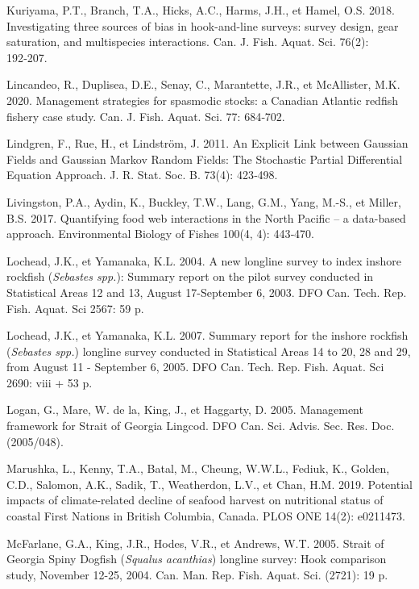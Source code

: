\documentclass[french,11pt]{book}
\begin{document}
\leavevmode\hypertarget{ref-kuriyama2018}{}%
Kuriyama, P.T., Branch, T.A., Hicks, A.C., Harms, J.H., et Hamel, O.S. 2018. Investigating three sources of bias in hook-and-line surveys: survey design, gear saturation, and multispecies interactions. Can. J. Fish. Aquat. Sci. 76(2): 192‑207.

\leavevmode\hypertarget{ref-lincandeo2020}{}%
Lincandeo, R., Duplisea, D.E., Senay, C., Marantette, J.R., et McAllister, M.K. 2020. Management strategies for spasmodic stocks: a Canadian Atlantic redfish fishery case study. Can. J. Fish. Aquat. Sci. 77: 684‑702.

\leavevmode\hypertarget{ref-lindgren2011}{}%
Lindgren, F., Rue, H., et Lindström, J. 2011. An Explicit Link between Gaussian Fields and Gaussian Markov Random Fields: The Stochastic Partial Differential Equation Approach. J. R. Stat. Soc. B. 73(4): 423‑498.

\leavevmode\hypertarget{ref-livingston2017}{}%
Livingston, P.A., Aydin, K., Buckley, T.W., Lang, G.M., Yang, M.-S., et Miller, B.S. 2017. Quantifying food web interactions in the North Pacific -- a data-based approach. Environmental Biology of Fishes 100(4, 4): 443‑470.

\leavevmode\hypertarget{ref-lochead2004}{}%
Lochead, J.K., et Yamanaka, K.L. 2004. A new longline survey to index inshore rockfish (\emph{Sebastes spp.}): Summary report on the pilot survey conducted in Statistical Areas 12 and 13, August 17-September 6, 2003. DFO Can. Tech. Rep. Fish. Aquat. Sci 2567: 59 p.

\leavevmode\hypertarget{ref-lochead2007}{}%
Lochead, J.K., et Yamanaka, K.L. 2007. Summary report for the inshore rockfish (\emph{Sebastes spp.}) longline survey conducted in Statistical Areas 14 to 20, 28 and 29, from August 11 - September 6, 2005. DFO Can. Tech. Rep. Fish. Aquat. Sci 2690: viii + 53 p.

\leavevmode\hypertarget{ref-logan2005}{}%
Logan, G., Mare, W. de la, King, J., et Haggarty, D. 2005. Management framework for Strait of Georgia Lingcod. DFO Can. Sci. Advis. Sec. Res. Doc. (2005/048).

\leavevmode\hypertarget{ref-marushka2019}{}%
Marushka, L., Kenny, T.A., Batal, M., Cheung, W.W.L., Fediuk, K., Golden, C.D., Salomon, A.K., Sadik, T., Weatherdon, L.V., et Chan, H.M. 2019. Potential impacts of climate-related decline of seafood harvest on nutritional status of coastal First Nations in British Columbia, Canada. PLOS ONE 14(2): e0211473.

\leavevmode\hypertarget{ref-mcfarlane2005}{}%
McFarlane, G.A., King, J.R., Hodes, V.R., et Andrews, W.T. 2005. Strait of Georgia Spiny Dogfish (\emph{Squalus acanthias}) longline survey: Hook comparison study, November 12-25, 2004. Can. Man. Rep. Fish. Aquat. Sci. (2721): 19 p.
\end{document}
